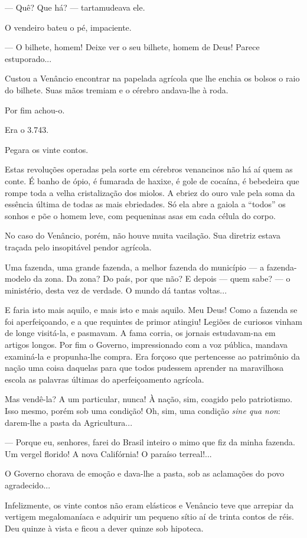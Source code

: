 --- Quê? Que há? --- tartamudeava ele.

O vendeiro bateu o pé, impaciente.

--- O bilhete, homem! Deixe ver o seu bilhete, homem de Deus! Parece
estuporado...

Custou a Venâncio encontrar na papelada agrícola que lhe enchia os
bolsos o raio do bilhete. Suas mãos tremiam e o cérebro andava-lhe à
roda.

Por fim achou-o.

Era o 3.743.

Pegara os vinte contos.

Estas revoluções operadas pela sorte em cérebros venancinos não há aí
quem as conte. É banho de ópio, é fumarada de haxixe, é gole de cocaína,
é bebedeira que rompe toda a velha cristalização dos miolos. A ebriez do
ouro vale pela soma da essência última de todas as mais ebriedades. Só
ela abre a gaiola a ``todos'' os sonhos e põe o homem leve, com
pequeninas asas em cada célula do corpo.

No caso do Venâncio, porém, não houve muita vacilação. Sua diretriz
estava traçada pelo insopitável pendor agrícola.

Uma fazenda, uma grande fazenda, a melhor fazenda do município --- a
fazenda-modelo da zona. Da zona? Do país, por que não? E depois --- quem
sabe? --- o ministério, desta vez de verdade. O mundo dá tantas
voltas...

E faria isto mais aquilo, e mais isto e mais aquilo. Meu Deus! Como a
fazenda se foi aperfeiçoando, e a que requintes de primor atingiu!
Legiões de curiosos vinham de longe visitá-la, e pasmavam. A fama
corria, os jornais estudavam-na em artigos longos. Por fim o Governo,
impressionado com a voz pública, mandava examiná-la e propunha-lhe
compra. Era forçoso que pertencesse ao patrimônio da nação uma coisa
daquelas para que todos pudessem aprender na maravilhosa escola as
palavras últimas do aperfeiçoamento agrícola.

Mas vendê-la? A um particular, nunca! À nação, sim, coagido pelo
patriotismo. Isso mesmo, porém sob uma condição! Oh, sim, uma condição
\emph{sine qua non}: darem-lhe a pasta da Agricultura...

--- Porque eu, senhores, farei do Brasil inteiro o mimo que fiz da minha
fazenda. Um vergel florido! A nova Califórnia! O paraíso terreal!...

O Governo chorava de emoção e dava-lhe a pasta, sob as aclamações do
povo agradecido...

Infelizmente, os vinte contos não eram elásticos e Venâncio teve que
arrepiar da vertigem megalomaníaca e adquirir um pequeno sítio aí de
trinta contos de réis. Deu quinze à vista e ficou a dever quinze sob
hipoteca.

